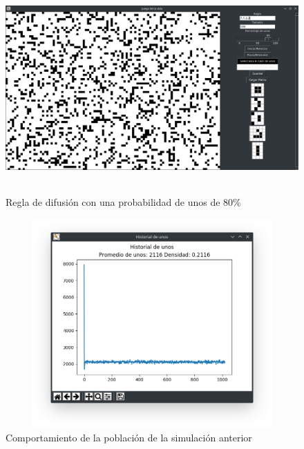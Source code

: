 \begin{figure}[H]
\begin{center}
 \includegraphics[width=12cm, height=8cm]{./img/diffusion80.png}
 \caption{Regla de difusión con una probabilidad de unos de 80\%}
 \label{fig:diffusion80}
\end{center}
\end{figure}

\begin{figure}[H]
\begin{center}
 \includegraphics[width=12cm, height=8cm]{./img/diffusion80grafica.png}
 \caption{Comportamiento de la población de la simulación anterior}
 \label{fig:diffusion80grafica}
\end{center}
\end{figure}


